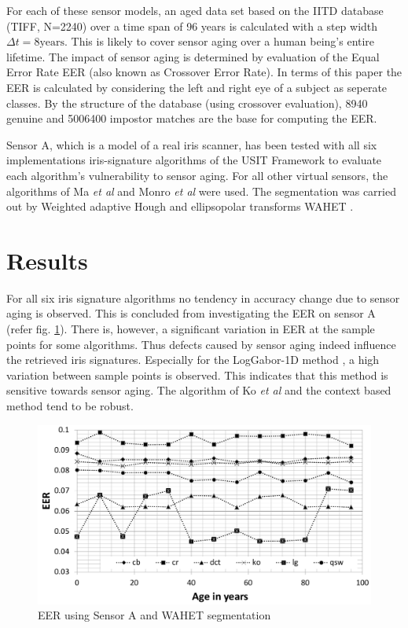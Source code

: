 \documentclass[10pt,twocolumn,letterpaper]{article}
\begin{document}
  \vspace{-4mm}
  For each of these sensor models, an aged data set based on the IITD database \cite{iitd} (TIFF, N=2240) over a time span of 96 years is calculated with a step width $\Delta t=8 \text{years}$. This is likely to cover sensor aging over a human being's entire lifetime. The impact of sensor aging is determined by evaluation of the Equal Error Rate EER (also known as Crossover Error Rate). In terms of this paper the EER is calculated by considering the left and right eye of a subject as seperate classes. By the structure of the database (using crossover evaluation), 8940 genuine and 5006400 impostor matches are the base for computing the EER.
  
  Sensor A, which is a model of a real iris scanner, has been tested with all six implementations iris-signature algorithms of the USIT Framework to evaluate each algorithm's vulnerability to sensor aging. For all other virtual sensors, the algorithms of Ma \emph{et al} \cite{Ma} and Monro \emph{et al} \cite{Monro} were used. The segmentation was carried out by Weighted adaptive Hough and ellipsopolar transforms WAHET \cite{wahet}. 
 
 \section{Results}
 \label{results}
 For all six iris signature algorithms no tendency in accuracy change due to sensor aging is observed. This is concluded from investigating the EER on sensor A (refer fig. \ref{fig:sensor1}). There is, however, a significant variation in EER at the sample points for some algorithms. Thus defects caused by sensor aging indeed influence the retrieved iris signatures. Especially for the LogGabor-1D method  \cite{lg}, a high variation between sample points is observed. This indicates that this method is sensitive towards sensor aging. The algorithm of Ko \emph{et al} \cite{ko} and the context based method \cite{cb} tend to be robust.
 
 \begin{figure}[h]
  \centering
  \includegraphics[width=\linewidth]{img/sensor1.png}
  \caption{EER using Sensor A and WAHET segmentation }
  \label{fig:sensor1}
\end{figure}
 
\end{document}
